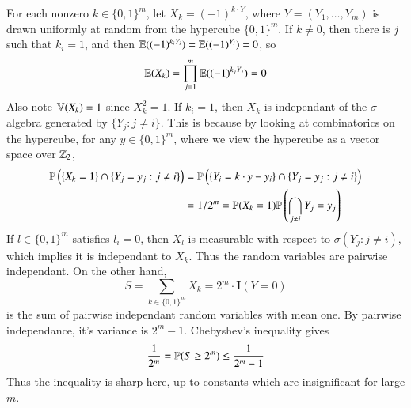 \begin{example}
    For each nonzero $k \in \{0,1\}^m$, let $X_k = (-1)^{k \cdot Y}$, where $Y = (Y_1, \dots, Y_m)$ is drawn uniformly at random from the hypercube $\{0,1\}^m$. If $k \neq 0$, then there is $j$ such that $k_i = 1$, and then $\operatorname{\mathbb{E}}((-1)^{k_i Y_i}) = \operatorname{\mathbb{E}}((-1)^{Y_i}) = 0$, so
    \[ \operatorname{\mathbb{E}}(X_k) = \prod_{j = 1}^m \operatorname{\mathbb{E}}((-1)^{k_j Y_j}) = 0 \]
    Also note $\operatorname{\mathbb{V}}(X_k) = 1$ since $X_k^2 = 1$. If $k_i = 1$, then $X_k$ is independant of the $\sigma$ algebra generated by $\{ Y_j : j \neq i \}$. This is because by looking at combinatorics on the hypercube, for any $y \in \{ 0, 1 \}^m$, where we view the hypercube as a vector space over $\operatorname{\mathbb{Z}}_2$,
    \begin{align*}
        \mathbb{P} \left( \{ X_k = 1 \} \cap \{ Y_j = y_j : j \neq i \} \right) &= \mathbb{P} \left( \{ Y_i = k \cdot y - y_i \} \cap \{ Y_j = y_j : j \neq i \} \right)\\
        &= 1/2^m = \mathbb{P}(X_k = 1) \mathbb{P} \left( \bigcap_{j \neq i} Y_j = y_j \right)
    \end{align*}
    If $l \in \{ 0, 1 \}^m$ satisfies $l_i = 0$, then $X_l$ is measurable with respect to $\sigma(Y_j: j \neq i)$, which implies it is independant to $X_k$. Thus the random variables are pairwise independant. On the other hand,
    \[ S = \sum_{k \in \{0,1\}^m} X_k = 2^m \cdot \mathbf{I}(Y = 0) \]
    is the sum of pairwise independant random variables with mean one. By pairwise independance, it's variance is $2^m - 1$. Chebyshev's inequality gives
    \[ \frac{1}{2^m} = \mathbb{P}(S \geq 2^m) \leq \frac{1}{2^m - 1} \]
    Thus the inequality is sharp here, up to constants which are insignificant for large $m$.
\end{example}

